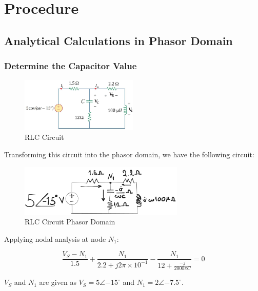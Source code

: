 \chapter{Procedure}

\section{Analytical Calculations in Phasor Domain}

\subsection{Determine the Capacitor Value}

\begin{figure}[h]
    \centering
    \includegraphics[width=0.5\textwidth]{assets/circuit.png}
    \caption{RLC Circuit}
    \label{fig:rlc-circuit}
\end{figure}

Transforming this circuit into the phasor domain, we have the following circuit:

\begin{figure}[h]
    \centering
    \includegraphics[width=0.7\textwidth]{assets/circuit-phasor.png}
    \caption{RLC Circuit Phasor Domain}
    \label{fig:rlc-circuit-phasor}
\end{figure}

Applying nodal analysis at node $N_{1}$:

\begin{equation}
    \frac{V_S - N_1}{1.5} + \frac{N_1}{2.2 + j 2\pi \times 10^{-1}} - \frac{N_1}{12 + \frac{-j}{2000\pi C}} = 0
\end{equation}

$V_S$ and $N_1$ are given as $V_S = 5 \angle{-15^{\circ}}$ and $N_1 = 2 \angle{-7.5^{\circ}}$.

\newpage
\thispagestyle{plain}


